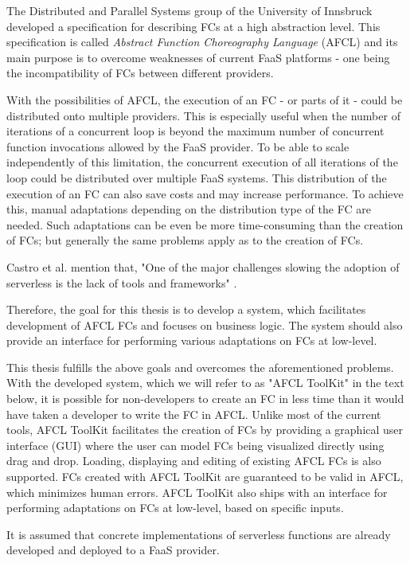 \documentclass[a4paper,top=25mm,bottom=25mm,12pt,pdftex,halfparskip,twoside,openany,bibtotoc,numbers=noenddot]{scrbook}
\begin{document}
\clearpage

The Distributed and Parallel Systems group of the University of Innsbruck developed a specification for describing FCs at a high abstraction level. This specification is called \emph{Abstract Function Choreography Language} (AFCL) and its main purpose is to overcome weaknesses of current FaaS platforms - one being the incompatibility of FCs between different providers.

With the possibilities of AFCL, the execution of an FC - or parts of it - could be distributed onto multiple providers. This is especially useful when the number of iterations of a concurrent loop is beyond the maximum number of concurrent function invocations allowed by the FaaS provider. To be able to scale independently of this limitation, the concurrent execution of all iterations of the loop could be distributed over multiple FaaS systems.
This distribution of the execution of an FC can also save costs and may increase performance.
To achieve this, manual adaptations depending on the distribution type of the FC are needed. Such adaptations can be even be more time-consuming than the creation of FCs; but generally the same problems apply as to the creation of FCs.

Castro et al. mention that, "One of the major challenges slowing the adoption of serverless is the lack of tools and frameworks" \cite{articles-rise-of-serverless-castro}.

Therefore, the goal for this thesis is to develop a system, which facilitates development of AFCL FCs and focuses on business logic.
The system should also provide an interface for performing various adaptations on FCs at low-level.

This thesis fulfills the above goals and overcomes the aforementioned problems.
With the developed system, which we will refer to as "AFCL ToolKit" in the text below, it is possible for non-developers to create an FC in less time than it would have taken a developer to write the FC in AFCL.
Unlike most of the current tools, AFCL ToolKit facilitates the creation of FCs by providing a graphical user interface (GUI) where the user can model FCs being visualized directly using drag and drop. Loading, displaying and editing of existing AFCL FCs is also supported.
FCs created with AFCL ToolKit are guaranteed to be valid in AFCL, which minimizes human errors.
AFCL ToolKit also ships with an interface for performing adaptations on FCs at low-level, based on specific inputs.

It is assumed that concrete implementations of serverless functions are already developed and deployed to a FaaS provider.
\end{document}
